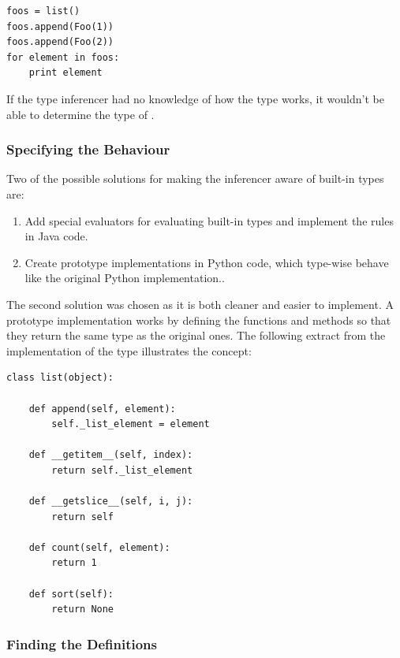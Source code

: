 \documentclass[12pt,halfparskip]{scrreprt}
\begin{document}
\begin{lstlisting}
foos = list()
foos.append(Foo(1))
foos.append(Foo(2))
for element in foos:
    print element
\end{lstlisting}

If the type inferencer had no knowledge of how the  type works, it wouldn't be able to determine the type of . 

\subsubsection{Specifying the Behaviour}

Two of the possible solutions for making the inferencer aware of built-in types are:

\begin{enumerate}
	\item Add special evaluators for evaluating built-in types and implement the rules in Java code.
	\item Create prototype implementations in Python code, which type-wise behave like the original Python implementation..
\end{enumerate}


The second solution was chosen as it is both cleaner and easier to implement. A prototype implementation works by defining the functions and methods so that they return the same type as the original ones. The following extract from the implementation of the  type illustrates the concept:

\begin{lstlisting}
class list(object):

    def append(self, element):
        self._list_element = element

    def __getitem__(self, index):
        return self._list_element

    def __getslice__(self, i, j):
        return self

    def count(self, element):
        return 1

    def sort(self):
        return None
\end{lstlisting}

\subsubsection{Finding the Definitions}
\end{document}
